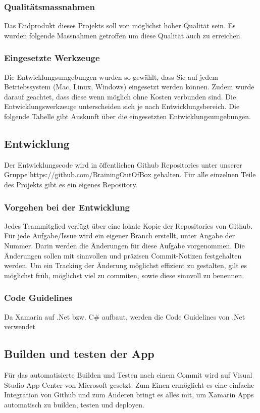 \subsubsection{Qualitätsmassnahmen}
Das Endprodukt dieses Projekts soll von möglichst hoher Qualität sein. Es wurden folgende Massnahmen getroffen um diese Qualität auch zu erreichen.


\subsubsection{Eingesetzte Werkzeuge}
Die Entwicklungsumgebungen wurden so gewählt, dass Sie auf jedem Betriebssystem (Mac, Linux, Windows) eingesetzt werden können. Zudem wurde darauf geachtet, dass diese wenn möglich ohne Kosten verbunden sind. Die Entwicklungswerkzeuge unterscheiden sich je nach Entwicklungsbereich. Die folgende Tabelle gibt Auskunft über die eingesetzten Entwicklungsumgebungen.


\subsection{Entwicklung}
Der Entwicklungscode wird in öffentlichen Github Repositories unter unserer Gruppe https://github.com/BrainingOutOfBox gehalten. Für alle einzelnen Teile des Projekts gibt es ein eigenes Repository.


\subsubsection{Vorgehen bei der Entwicklung}
Jedes Teammitglied verfügt über eine lokale Kopie der Repositories von Github. Für jede Aufgabe/Issue wird ein eigener Branch erstellt, unter Angabe der Nummer. Darin werden die Änderungen für diese Aufgabe vorgenommen. Die Änderungen sollen mit sinnvollen und präzisen Commit-Notizen festgehalten werden. Um ein Tracking der Änderung möglichst effizient zu gestalten, gilt es möglichst früh, möglichst viel zu commiten, sowie diese sinnvoll zu benennen.

\subsubsection{Code Guidelines}
Da Xamarin auf .Net bzw. C\# aufbaut, werden die Code Guidelines von .Net verwendet

\subsection{Builden und testen der App}
Für das automatisierte Builden und Testen nach einem Commit wird auf Visual Studio App Center von Microsoft gesetzt. Zum Einen ermöglicht es eine einfache Integration von Github und zum Anderen bringt es alles mit, um Xamarin Apps automatisch zu builden, testen und deployen. 
